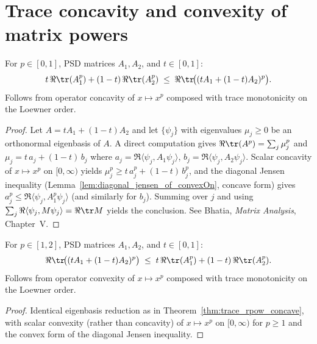 \section{Trace concavity and convexity of matrix powers}

\begin{theorem}\label{thm:trace_rpow_concave}
    \leanok
    For $p\in[0,1]$, PSD matrices $A_1,A_2$, and $t\in[0,1]$:
    \[
        t\,\Re\tr(A_1^p)+(1-t)\,\Re\tr(A_2^p)
        \;\le\;
        \Re\tr\!\bigl((tA_1+(1-t)A_2)^p\bigr).
    \]
    Follows from operator concavity of $x\mapsto x^p$ composed with trace
    monotonicity on the Loewner order.
\end{theorem}

\begin{proof}\leanok
    Let $A=tA_1+(1-t)A_2$ and let $\{\psi_j\}$ with eigenvalues
    $\mu_j\ge 0$ be an orthonormal eigenbasis of $A$. A direct
    computation gives $\Re\tr(A^p)=\sum_j \mu_j^p$ and
    $\mu_j=t\,a_j+(1-t)\,b_j$ where
    $a_j=\Re\langle\psi_j,A_1\psi_j\rangle$,
    $b_j=\Re\langle\psi_j,A_2\psi_j\rangle$.
    Scalar concavity of $x\mapsto x^p$ on $[0,\infty)$ yields
    $\mu_j^p\ge t\,a_j^p+(1-t)\,b_j^p$, and the diagonal Jensen
    inequality (Lemma~\ref{lem:diagonal_jensen_of_convexOn},
    concave form) gives
    $a_j^p\le\Re\langle\psi_j,A_1^p\psi_j\rangle$ (and similarly for
    $b_j$). Summing over $j$ and using
    $\sum_j\Re\langle\psi_j,M\psi_j\rangle=\Re\tr M$ yields the
    conclusion. See Bhatia, \emph{Matrix Analysis}, Chapter~V.
\end{proof}

\begin{theorem}\label{thm:trace_rpow_convex}
    \leanok
    For $p\in[1,2]$, PSD matrices $A_1,A_2$, and $t\in[0,1]$:
    \[
        \Re\tr\!\bigl((tA_1+(1-t)A_2)^p\bigr)
        \;\le\;
        t\,\Re\tr(A_1^p)+(1-t)\,\Re\tr(A_2^p).
    \]
    Follows from operator convexity of $x\mapsto x^p$ composed with trace
    monotonicity on the Loewner order.
\end{theorem}

\begin{proof}\leanok
    Identical eigenbasis reduction as in
    Theorem~\ref{thm:trace_rpow_concave}, with scalar convexity
    (rather than concavity) of $x\mapsto x^p$ on $[0,\infty)$ for
    $p\ge 1$ and the convex form of the diagonal Jensen inequality.
\end{proof}

